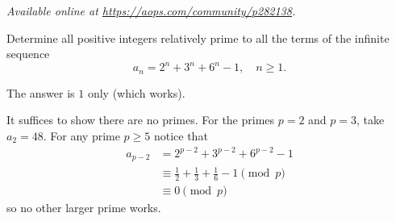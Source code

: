 \textsl{Available online at \url{https://aops.com/community/p282138}.}
\begin{mdframed}[style=mdpurplebox,frametitle={Problem statement}]
Determine all positive integers relatively
prime to all the terms of the infinite sequence
\[ a_n = 2^n+3^n+6^n-1, \quad n \ge 1. \]
\end{mdframed}
The answer is $1$ only (which works).

It suffices to show there are no primes.
For the primes $p=2$ and $p=3$, take $a_2=48$.
For any prime $p \ge 5$ notice that
\begin{align*}
  a_{p-2} &= 2^{p-2} + 3^{p-2} + 6^{p-2} - 1 \\
  &\equiv \frac 12 + \frac 13 + \frac 16 - 1 \pmod p \\
  &\equiv 0 \pmod p
\end{align*}
so no other larger prime works.
\pagebreak